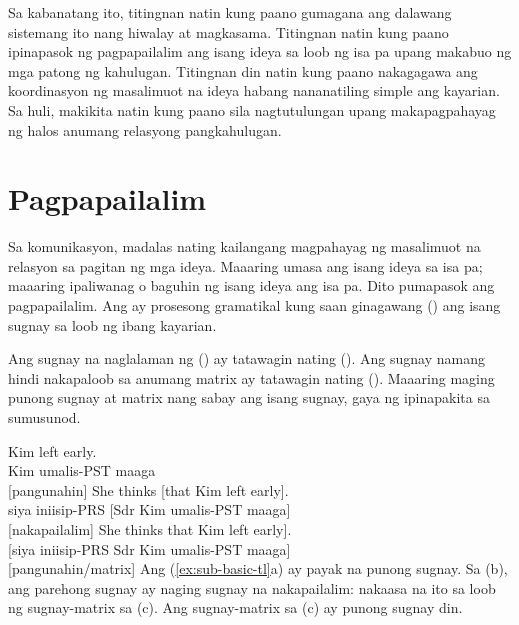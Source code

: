 Sa kabanatang ito, titingnan natin kung paano gumagana ang dalawang sistemang ito nang hiwalay at magkasama. Titingnan natin kung paano ipinapasok ng pagpapailalim ang isang ideya sa loob ng isa pa upang makabuo ng mga patong ng kahulugan. Titingnan din natin kung paano nakagagawa ang koordinasyon ng masalimuot na ideya habang nananatiling simple ang kayarian. Sa huli, makikita natin kung paano sila nagtutulungan upang makapagpahayag ng halos anumang relasyong pangkahulugan.

\section{Pagpapailalim}\label{sec:subordination-tl}

Sa komunikasyon, madalas nating kailangang magpahayag ng masalimuot na relasyon sa pagitan ng mga ideya. Maaaring umasa ang isang ideya sa isa pa; maaaring ipaliwanag o baguhin ng isang ideya ang isa pa. Dito pumapasok ang pagpapailalim. Ang  ay prosesong gramatikal kung saan ginagawang  () ang isang sugnay sa loob ng ibang kayarian.

Ang sugnay na naglalaman ng  () ay tatawagin nating  (). Ang sugnay namang hindi nakapaloob sa anumang matrix ay tatawagin nating  (). Maaaring maging punong sugnay at matrix nang sabay ang isang sugnay, gaya ng ipinapakita sa sumusunod.

\ea \label{ex:sub-basic-tl}
    \ea \gll Kim left early.\\
        Kim umalis-PST maaga\\
    \glt {} [pangunahin]
    \ex \gll She thinks {[}that Kim left early{]}.\\
        siya iniisip-PRS {[}Sdr Kim umalis-PST maaga{]}\\
    \glt {} [nakapailalim]
    \ex \gll {[}She thinks that Kim left early{]}.\\
        {[}siya iniisip-PRS Sdr Kim umalis-PST maaga{]}\\
    \glt {} [pangunahin/matrix]
    \z
\z
Ang (\ref{ex:sub-basic-tl}a) ay payak na punong sugnay. Sa (b), ang parehong sugnay ay naging sugnay na nakapailalim: nakaasa na ito sa loob ng sugnay-matrix sa (c). Ang sugnay-matrix sa (c) ay punong sugnay din.

